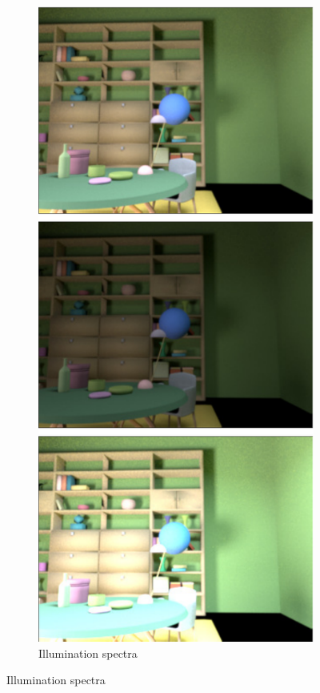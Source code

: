 \documentclass{jov}
\begin{document}
\begin{figure}
\begin{subfigure}{0.18 \textwidth}
        \label{fig:targetVariation}
    \end{subfigure}
    ~
    \begin{subfigure}{0.18 \textwidth}
    \centering
        \caption{Illumination spectra}
        \includegraphics[width=\textwidth]{../FiguresDraft5/Figure4/Figure4_d.pdf}

\end{subfigure}
\end{figure}
\end{document}

